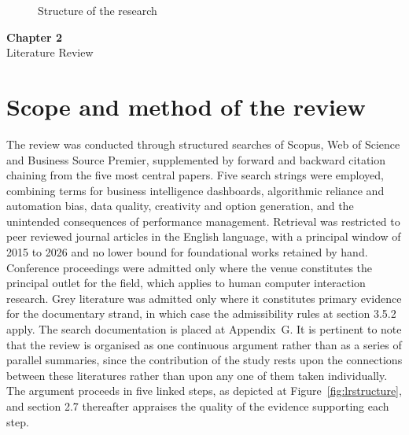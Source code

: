 \documentclass[12pt,a4paper]{article}
\newcounter{chapno}
\newcommand{\chapt}[2]{%
  \newpage
  \setcounter{chapno}{#1}%
  \setcounter{section}{0}\setcounter{subsection}{0}%
  \setcounter{figure}{0}\setcounter{table}{0}%
  \addtocontents{toc}{\protect\vspace{9pt}}%
  \addtocontents{toc}{\protect\noindent{\protect\bfseries Chapter #1:} #2\protect\par\protect\vspace{3pt}}%
  \begin{center}
    {\large\bfseries Chapter #1}\\[8pt]
    {\large #2}
  \end{center}
  \vspace{14pt}%
}
\begin{document}
\begin{figure}[H]
\centering
{}
\caption{Structure of the research}
\label{fig:structure}
\end{figure}

\chapt{2}{Literature Review}

\section{Scope and method of the review}

The review was conducted through structured searches of Scopus, Web of Science and Business Source
Premier, supplemented by forward and backward citation chaining from the five most central papers.
Five search strings were employed, combining terms for business intelligence dashboards,
algorithmic reliance and automation bias, data quality, creativity and option generation, and the
unintended consequences of performance management. Retrieval was restricted to peer reviewed
journal articles in the English language, with a principal window of 2015 to 2026 and no lower
bound for foundational works retained by hand. Conference proceedings were admitted only where the
venue constitutes the principal outlet for the field, which applies to human computer interaction
research. Grey literature was admitted only where it constitutes primary evidence for the
documentary strand, in which case the admissibility rules at section 3.5.2 apply. The search
documentation is placed at Appendix~G. It is pertinent to note that the review is organised as one
continuous argument rather than as a series of parallel summaries, since the contribution of the
study rests upon the connections between these literatures rather than upon any one of them taken
individually. The argument proceeds in five linked steps, as depicted at
Figure~\ref{fig:lrstructure}, and section 2.7 thereafter appraises the quality of the evidence
supporting each step.
\end{document}
